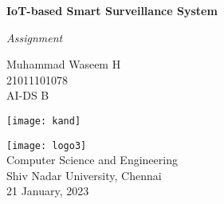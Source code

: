 \begin{titlepage}
    \centering
        \vspace*{2cm}
        \Huge
        \textbf{IoT-based Smart Surveillance System}
        
        \vspace*{0.6cm}
        \Large
        \textit{Assignment}
        
        \normalsize
        \vspace*{1.5cm}
        Muhammad Waseem H\\
        \vspace{0.2cm}
        21011101078\\
        \vspace{0.2cm}
        AI-DS B\\
        
        \vfill
        
        
        
        \texttt{[image: kand]}\\
        
        \vfill
        
        
        \texttt{[image: logo3]}\\
        Computer Science and Engineering\\
        Shiv Nadar University, Chennai\\
        21 January, 2023
        \vspace*{1cm}
    
\end{titlepage}